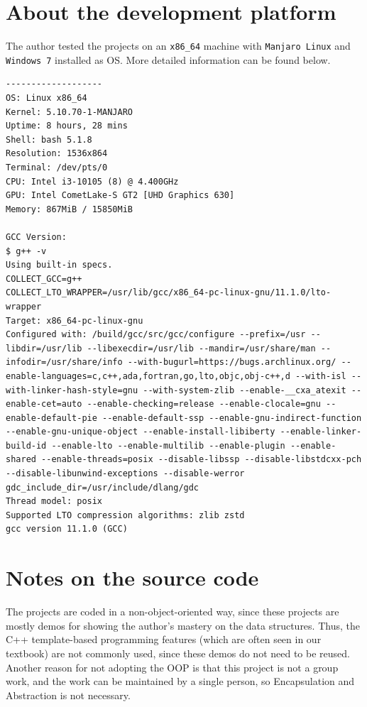 \documentclass[cn,black,12pt,normal]{elegantnote}
\begin{document}
\section{About the development platform}

The author tested the projects on an \lstinline{x86_64} machine with \lstinline{Manjaro Linux} and \lstinline{Windows 7} installed as OS. More detailed information can be found below.

\begin{lstlisting}
-------------------
OS: Linux x86_64
Kernel: 5.10.70-1-MANJARO
Uptime: 8 hours, 28 mins
Shell: bash 5.1.8
Resolution: 1536x864
Terminal: /dev/pts/0
CPU: Intel i3-10105 (8) @ 4.400GHz
GPU: Intel CometLake-S GT2 [UHD Graphics 630]
Memory: 867MiB / 15850MiB

GCC Version:
$ g++ -v
Using built-in specs.
COLLECT_GCC=g++
COLLECT_LTO_WRAPPER=/usr/lib/gcc/x86_64-pc-linux-gnu/11.1.0/lto-wrapper
Target: x86_64-pc-linux-gnu
Configured with: /build/gcc/src/gcc/configure --prefix=/usr --libdir=/usr/lib --libexecdir=/usr/lib --mandir=/usr/share/man --infodir=/usr/share/info --with-bugurl=https://bugs.archlinux.org/ --enable-languages=c,c++,ada,fortran,go,lto,objc,obj-c++,d --with-isl --with-linker-hash-style=gnu --with-system-zlib --enable-__cxa_atexit --enable-cet=auto --enable-checking=release --enable-clocale=gnu --enable-default-pie --enable-default-ssp --enable-gnu-indirect-function --enable-gnu-unique-object --enable-install-libiberty --enable-linker-build-id --enable-lto --enable-multilib --enable-plugin --enable-shared --enable-threads=posix --disable-libssp --disable-libstdcxx-pch --disable-libunwind-exceptions --disable-werror gdc_include_dir=/usr/include/dlang/gdc
Thread model: posix
Supported LTO compression algorithms: zlib zstd
gcc version 11.1.0 (GCC)

\end{lstlisting}

\section{Notes on the source code}

The projects are coded in a non-object-oriented way, since these projects are mostly demos for showing the author's mastery on the data structures. Thus, the C++ template-based programming features (which are often seen in our textbook) are not commonly used, since these demos do not need to be reused. Another reason for not adopting the OOP is that this project is not a group work, and the work can be maintained by a single person, so Encapsulation and Abstraction is not necessary.
\end{document}
